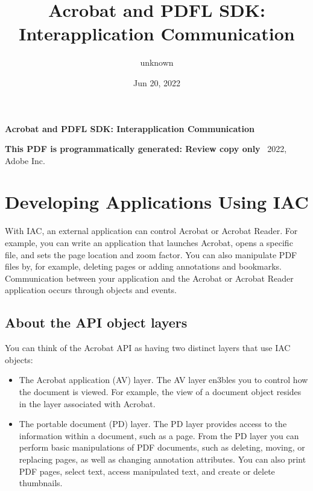 \documentclass[letterpaper,12pt,english,openany,oneside]{sphinxmanual}
\title{Acrobat and PDFL SDK: Interapplication Communication}
\date{Jun 20, 2022}
\author{unknown}
\begin{document}
\pagestyle{empty}

    \begin{titlepage}
        \begin{figure}[h]
        \end{figure}
        \centering
        \vspace*{40mm}
        \textbf{\Huge Acrobat and PDFL SDK: Interapplication Communication}

        \vspace{15mm}
        \Large \textbf{{This PDF is programmatically generated: Review copy only}}
        \vfill
        \small \textcopyright\ 2022, Adobe Inc.
    \end{titlepage}
    \clearpage
    \tableofcontents
    \clearpage
    
\pagestyle{plain}

\pagestyle{normal}
\label{\detokenize{toc::doc}}



\chapter{Developing Applications Using IAC}
\label{\detokenize{index:developing-applications-using-iac}}\label{\detokenize{index::doc}}
With IAC, an external application can control Acrobat or Acrobat Reader. For example, you can write an application that launches Acrobat, opens a specific file, and sets the page location and zoom factor. You can also manipulate PDF files by, for example, deleting pages or adding annotations and bookmarks. Communication between your application and the Acrobat or Acrobat Reader application occurs through objects and events.




\section{About the API object layers}
\label{\detokenize{index:about-the-api-object-layers}}
You can think of the Acrobat API as having two distinct layers that use IAC objects:
\begin{itemize}
\item {} 
The Acrobat application (AV) layer. The AV layer en3bles you to control how the document is viewed. For example, the view of a document object resides in the layer associated with Acrobat.

\item {} 
The portable document (PD) layer. The PD layer provides access to the information within a document, such as a page. From the PD layer you can perform basic manipulations of PDF documents, such as deleting, moving, or replacing pages, as well as changing annotation attributes. You can also print PDF pages, select text, access manipulated text, and create or delete thumbnails.

\end{itemize}
\end{document}
